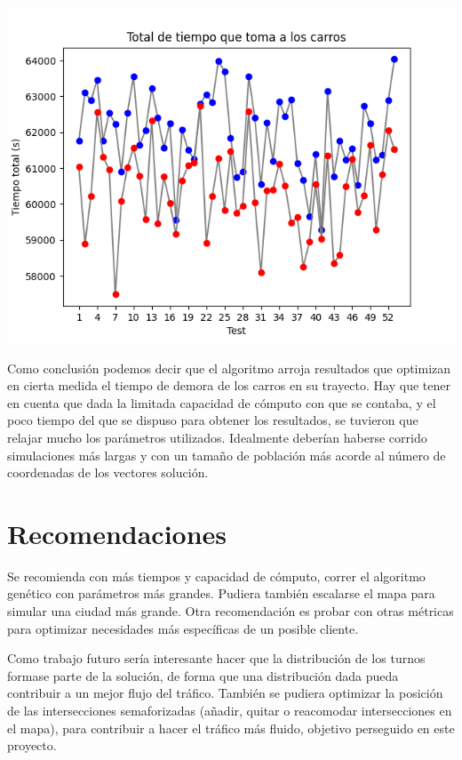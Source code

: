 \documentclass[colorinlistoftodos,twoside,twocolumn]{article} %
\begin{document}
	\begin{center}
		\includegraphics[width=\columnwidth]{graphic_total_time_take_cars.png}
	\end{center}

	Como conclusi\'on podemos decir que el algoritmo arroja resultados que optimizan en cierta medida el tiempo de demora de los carros en su trayecto. Hay que tener en cuenta que dada la limitada capacidad de c\'omputo con que se contaba, y el poco tiempo del que se dispuso para obtener los resultados, se tuvieron que relajar mucho los par\'ametros utilizados. Idealmente deber\'ian haberse corrido simulaciones m\'as largas y con un tama\~no de poblaci\'on m\'as acorde al n\'umero de coordenadas de los vectores soluci\'on.

	\section{Recomendaciones}
	
	
	
	Se recomienda con m\'as tiempos y capacidad de c\'omputo, correr el algoritmo gen\'etico con par\'ametros m\'as grandes. Pudiera tambi\'en escalarse el mapa para simular una ciudad m\'as grande. Otra recomendaci\'on es probar con otras m\'etricas para optimizar  necesidades m\'as espec\'ificas de un posible cliente.
	
	Como trabajo futuro ser\'ia interesante hacer que la distribuci\'on de los turnos formase parte de la soluci\'on, de forma que una distribuci\'on dada pueda contribuir a un mejor flujo del tr\'afico. Tambi\'en se pudiera optimizar la posici\'on de las intersecciones semaforizadas (a\~nadir, quitar o reacomodar intersecciones en el mapa), para contribuir a hacer el tr\'afico m\'as fluido, objetivo perseguido en este proyecto.
	
\end{document}
